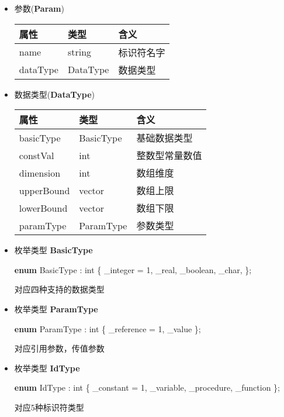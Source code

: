 \documentclass[]{ctexart}
\newenvironment{Shaded}{}{}
\newcommand{\DataTypeTok}[1]{\textcolor[rgb]{0.56,0.13,0.00}{#1}}
\newcommand{\DecValTok}[1]{\textcolor[rgb]{0.25,0.63,0.44}{#1}}
\newcommand{\KeywordTok}[1]{\textcolor[rgb]{0.00,0.44,0.13}{\textbf{#1}}}
\newcommand{\NormalTok}[1]{#1}
\begin{document}
\begin{itemize}
\item
  参数(\textbf{Param})

  \begin{longtable}[]{@{}lll@{}}
  \toprule
  属性 & 类型 & 含义\tabularnewline
  \midrule
  \endhead
  name & string & 标识符名字\tabularnewline
  dataType & DataType & 数据类型\tabularnewline
  \bottomrule
  \end{longtable}
\item
  数据类型(\textbf{DataType})

  \begin{longtable}[]{@{}lll@{}}
  \toprule
  属性 & 类型 & 含义\tabularnewline
  \midrule
  \endhead
  basicType & BasicType & 基础数据类型\tabularnewline
  constVal & int & 整数型常量数值\tabularnewline
  dimension & int & 数组维度\tabularnewline
  upperBound & vector & 数组上限\tabularnewline
  lowerBound & vector & 数组下限\tabularnewline
  paramType & ParamType & 参数类型\tabularnewline
  \bottomrule
  \end{longtable}
\item
  枚举类型 \textbf{BasicType}

\begin{Shaded}
\begin{Highlighting}[]
\KeywordTok{enum}\NormalTok{ BasicType : }\DataTypeTok{int}
\NormalTok{\{}
\NormalTok{	_integer = }\DecValTok{1}\NormalTok{,}
\NormalTok{	_real,}
\NormalTok{	_boolean,}
\NormalTok{	_char,}
\NormalTok{\};	}
\end{Highlighting}
\end{Shaded}

  对应四种支持的数据类型
\item
  枚举类型 \textbf{ParamType}

\begin{Shaded}
\begin{Highlighting}[]
\KeywordTok{enum}\NormalTok{ ParamType : }\DataTypeTok{int}
\NormalTok{\{}
\NormalTok{_reference = }\DecValTok{1}\NormalTok{,}
\NormalTok{_value}
\NormalTok{\};}
\end{Highlighting}
\end{Shaded}

  对应引用参数，传值参数
\item
  枚举类型 \textbf{IdType}

\begin{Shaded}
\begin{Highlighting}[]
\KeywordTok{enum}\NormalTok{ IdType : }\DataTypeTok{int}
\NormalTok{\{}
\NormalTok{  _constant = }\DecValTok{1}\NormalTok{,}
\NormalTok{  _variable,}
\NormalTok{  _procedure,}
\NormalTok{  _function}
\NormalTok{\};}
\end{Highlighting}
\end{Shaded}

  对应5种标识符类型
\end{itemize}
\end{document}
